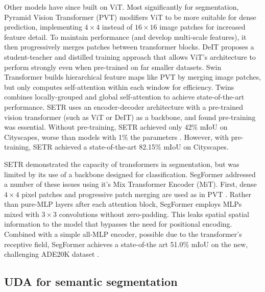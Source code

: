 \documentclass[a4paper,12pt]{report}
\begin{document}
Other models have since built on ViT. Most significantly for segmentation, Pyramid Vision Transformer (PVT) \cite{wang_pyramid_2021} modifiers ViT to be more suitable for dense prediction, implementing $4 \times 4$ instead of $16 \times 16$ image patches for increased feature detail. To maintain performance (and develop multi-scale features), it then progressively merges patches between transformer blocks. DeIT \cite{touvron_training_2021} proposes a student-teacher and distilled training approach that allows ViT’s architecture to perform strongly even when pre-trained on far smaller datasets. Swin Transformer \cite{liu_swin_2021} builds hierarchical feature maps like PVT by merging image patches, but only computes self-attention within each window for efficiency. Twins \cite{chu_twins_2021} combines locally-grouped and global self-attention to achieve state-of-the-art performance. SETR \cite{zheng_rethinking_2021} uses an encoder-decoder architecture with a pre-trained vision transformer (such as ViT or DeIT) as a backbone, and found pre-training was essential. Without pre-training, SETR achieved only 42\% mIoU on Cityscapes, worse than models with 1\% the parameters \cite{paszke_enet_2016}. However, with pre-training, SETR achieved a state-of-the-art 82.15\% mIoU on Cityscapes.

SETR demonstrated the capacity of transformers in segmentation, but was limited by its use of a backbone designed for classification. SegFormer \cite{xie_segformer_2021} addressed a number of these issues using it’s Mix Transformer Encoder (MiT). First, dense $4 \times 4$ pixel patches and progressive patch merging are used as in PVT \cite{wang_pyramid_2021}. Rather than pure-MLP layers after each attention block, SegFormer employs MLPs mixed with $3 \times 3$ convolutions without zero-padding. This leaks spatial spatial information to the model that bypasses the need for positional encoding. Combined with a simple all-MLP encoder, possible due to the transformer’s receptive field, SegFormer achieves a state-of-the art 51.0\% mIoU on the new, challenging ADE20K dataset \cite{zhou_semantic_2018}.

\subsection*{UDA for semantic segmentation}
\end{document}

